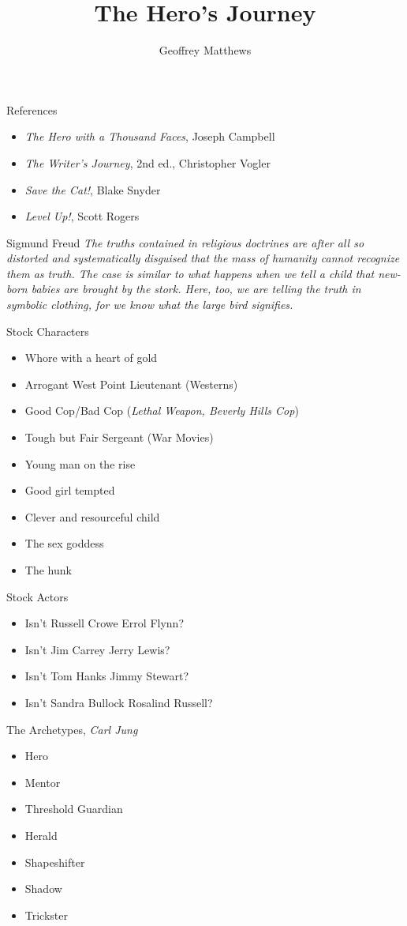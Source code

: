 \documentclass[a4paper,azure,pdf,colorBG,slideColor]{prosper}
\title{The Hero's Journey}
\author{Geoffrey Matthews}
\newcommand{\ns}[1]{\vfill \end{slide}\begin{slide}{#1}}
\newcommand{\bi}{\begin{itemize}}
\newcommand{\ei}{\end{itemize}}
\begin{document}
\maketitle

\begin{slide}{References}
\bi
\item {\em The Hero with a Thousand Faces}, Joseph Campbell
\item {\em The Writer's Journey}, 2nd ed., Christopher Vogler
\item {\em Save the Cat!}, Blake Snyder
\item {\em Level Up!}, Scott Rogers
\ei

\ns{Sigmund Freud}
{\sf  \em
The truths contained in religious doctrines are after all so distorted
and systematically disguised that the mass of humanity cannot
recognize them as truth.  The case is similar to what happens when we
tell a child that new-born babies are brought by the stork.  Here,
too, we are telling the truth in symbolic clothing, for we know what
the large bird signifies.
}

\ns{Stock Characters}

\bi
\item Whore with a heart of gold
\item Arrogant West Point Lieutenant (Westerns)
\item Good Cop/Bad Cop ({\em Lethal Weapon, Beverly Hills Cop})
\item Tough but Fair Sergeant (War Movies)
\item Young man on the rise
\item Good girl tempted
\item Clever and resourceful child
\item The sex goddess
\item The hunk
\ei

\ns{Stock Actors}
\bi
\item Isn't Russell Crowe  Errol Flynn?
\item Isn't Jim Carrey  Jerry Lewis?
\item Isn't Tom Hanks  Jimmy Stewart?
\item Isn't Sandra Bullock  Rosalind Russell?
\ei


\ns{The Archetypes, \em Carl Jung}

\bi
\item Hero
\item Mentor
\item Threshold Guardian
\item Herald
\item Shapeshifter
\item Shadow
\item Trickster
\ei


\end{slide}
\end{document}
